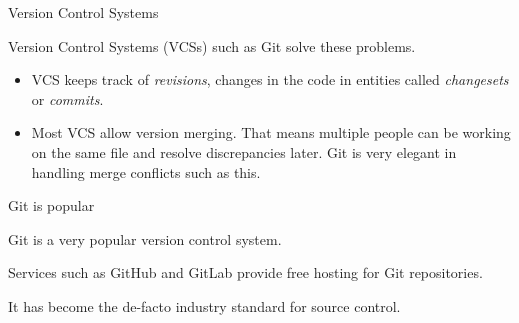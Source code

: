 \documentclass{beeper}
\begin{document}




\begin{frame}{Version Control Systems}

    Version Control Systems (VCSs) such as Git solve these problems.

    \begin{itemize}[<+->]
        \item VCS keeps track of \textit{revisions}, changes in the code in
            entities called \textit{changesets} or \textit{commits}.
        \item Most VCS allow version merging. That means multiple people can be
            working on the same file and resolve discrepancies later. Git is
            very elegant in handling merge conflicts such as this.
    \end{itemize}
\end{frame}

\begin{frame}{Git is popular}

    Git is a very popular version control system.

    Services such as GitHub and GitLab provide free hosting for Git
    repositories.

    It has become the de-facto industry standard for source control.

\end{frame}
\end{document}
